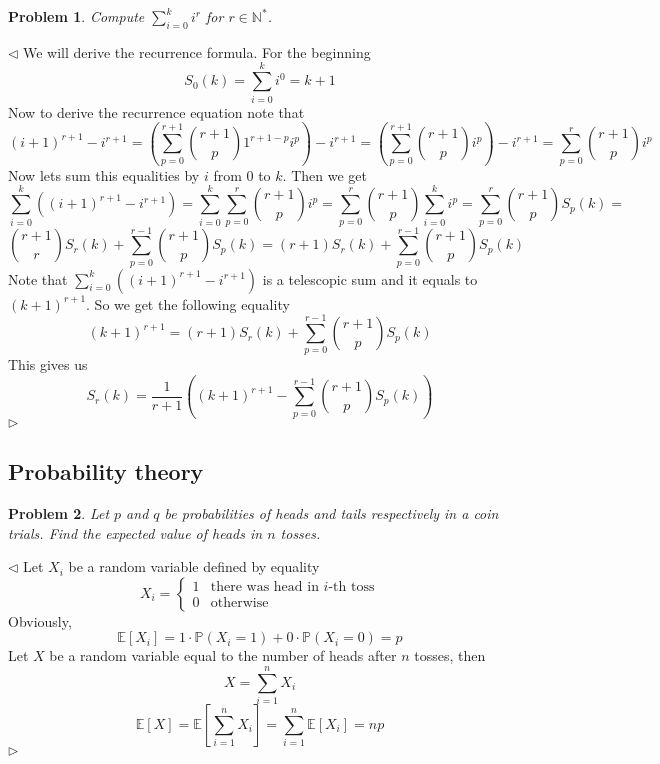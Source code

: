 \documentclass[12pt]{article}
\newtheorem{problem}{Problem}[subsection]
\newenvironment{solution}{\par $\triangleleft$}{$\triangleright$}
\begin{document}
\begin{problem} Compute $\sum_{i=0}^k i^r$ for $r\in\mathbb{N}^*$.
\end{problem}
\begin{solution}
We will derive the recurrence formula. For the beginning
$$
S_0(k)=\sum\limits_{i=0}^k i^0=k+1
$$
Now to derive the recurrence equation note that
$$
(i+1)^{r+1}-i^{r+1}=
\left(\sum\limits_{p=0}^{r+1} \binom{r+1}{p} 1^{r+1-p} i^p\right) -i^{r+1}= 
\left(\sum\limits_{p=0}^{r+1} \binom{r+1}{p} i^p\right) -i^{r+1}= 
\sum\limits_{p=0}^{r} \binom{r+1}{p} i^p
$$
Now lets sum this equalities by $i$ from $0$ to $k$. Then we get
$$
\sum\limits_{i=0}^{k} \left((i+1)^{r+1}-i^{r+1}\right)=
\sum\limits_{i=0}^{k} \sum\limits_{p=0}^{r} \binom{r+1}{p} i^p=
\sum\limits_{p=0}^{r} \binom{r+1}{p}\sum\limits_{i=0}^{k}  i^p=
\sum\limits_{p=0}^{r} \binom{r+1}{p}S_p(k)=
$$
$$
\binom{r+1}{r}S_{r}(k)+\sum\limits_{p=0}^{r-1} \binom{r+1}{p}S_p(k)=
(r+1)S_{r}(k)+\sum\limits_{p=0}^{r-1} \binom{r+1}{p}S_p(k)
$$
Note that $\sum\limits_{i=0}^{k} \left((i+1)^{r+1}-i^{r+1}\right)$ is a telescopic sum and it equals to $(k+1)^{r+1}$. So we get the following equality
$$
(k+1)^{r+1}=(r+1)S_{r}(k)+\sum\limits_{p=0}^{r-1} \binom{r+1}{p}S_p(k)
$$
This gives us
$$
S_r(k)=\frac{1}{r+1}\left((k+1)^{r+1}-\sum\limits_{p=0}^{r-1} \binom{r+1}{p}S_p(k)\right)
$$
\end{solution}
 
 
 
 
 
 
 
 
 
 
 
 
 
 
 
 
 
\newpage
 
\subsection{Probability theory}
 
\begin{problem} Let $p$ and $q$ be probabilities of heads and tails respectively in  a coin trials. Find the expected value of heads in $n$ tosses.
\end{problem}
\begin{solution} Let $X_i$ be a random variable defined by equality
$$
X_i=\begin{cases} 1&\mbox{there was head in $i$-th toss}\\0&\mbox{otherwise}\end{cases}
$$
Obviously,
$$
\mathbb{E}[X_i]=1\cdot\mathbb{P}({X_i=1})+0\cdot\mathbb{P}({X_i=0})=p
$$
Let $X$ be a random variable equal to the number of heads after $n$ tosses, then 
$$
X=\sum_{i=1}^n X_i
$$
$$
\mathbb{E}[X]=\mathbb{E}\left[\sum_{i=1}^n X_i\right]=\sum_{i=1}^n\mathbb{E}[X_i]=np
$$
\end{solution}
 
\end{document}

